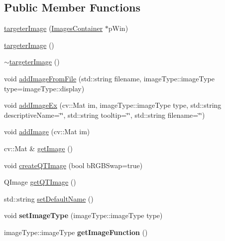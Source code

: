 \subsection*{Public Member Functions}
\begin{DoxyCompactItemize}
\item 
\hyperlink{classtargeter_image_a2a82f686b73602837e2fb304ce37861d}{targeter\+Image} (\hyperlink{class_images_container}{Images\+Container} $\ast$p\+Win)
\item 
\hyperlink{classtargeter_image_a5fadb46e9235423e05b42e301b33c83f}{targeter\+Image} ()
\item 
\hyperlink{classtargeter_image_a885fd05e144dff445373442278e96c1b}{$\sim$targeter\+Image} ()
\item 
void \hyperlink{classtargeter_image_a3ebd45ebb6d80dbb175906efbfd5e479}{add\+Image\+From\+File} (std\+::string filename, image\+Type\+::image\+Type type=image\+Type\+::display)
\item 
void \hyperlink{classtargeter_image_a71d81d6bc145df61da64989c14444d76}{add\+Image\+Ex} (cv\+::\+Mat im, image\+Type\+::image\+Type type, std\+::string descriptive\+Name=\char`\"{}\char`\"{}, std\+::string tooltip=\char`\"{}\char`\"{}, std\+::string filename=\char`\"{}\char`\"{})
\item 
void \hyperlink{classtargeter_image_a20a228c177141e4f0ca2a7776c7f242d}{add\+Image} (cv\+::\+Mat im)
\item 
cv\+::\+Mat \& \hyperlink{classtargeter_image_a2a66aadfba8fe64dfde9725bde71808c}{get\+Image} ()
\item 
void \hyperlink{classtargeter_image_affcf9e83dc25eb200a8919518cf40155}{create\+Q\+T\+Image} (bool b\+R\+G\+B\+Swap=true)
\item 
Q\+Image \hyperlink{classtargeter_image_a9c5c783a82afecd73a0b877d3bfdfc01}{get\+Q\+T\+Image} ()
\item 
std\+::string \hyperlink{classtargeter_image_a47b6c3edc2c1854523e6f14504a64883}{set\+Default\+Name} ()
\item 
\mbox{\label{classtargeter_image_a170820c93d910509215d3a47a91aa92e}} 
void {\bfseries set\+Image\+Type} (image\+Type\+::image\+Type type)
\item 
\mbox{\label{classtargeter_image_a53176820ff167a5d0cdcb660a767d15b}} 
image\+Type\+::image\+Type {\bfseries get\+Image\+Function} ()
\item 
\mbox{\label{classtargeter_image_a2a6e7ae1dad077db2a3e25e936976ca1}} 

\end{DoxyCompactItemize}
